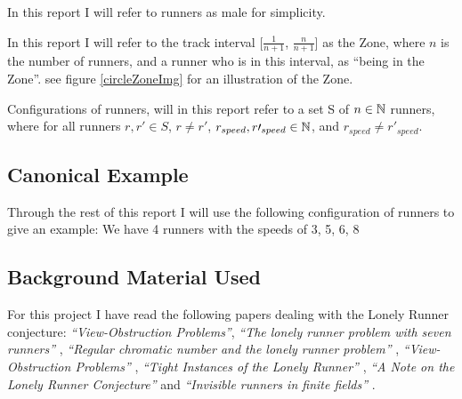 In this report I will refer to runners as male for simplicity.

\begin{defi}
\label{def:theZone}
In this report I will refer to the track interval [$\frac{1}{n + 1}$, $\frac{n}{n+1}$] as the Zone, where $n$ is the number of runners, and a runner who is in this interval, as ``being in the Zone''. see figure \ref{circleZoneImg} for an illustration of the Zone.
\end{defi}

\begin{defi}
\label{def:config}
Configurations of runners, will in this report refer to a set S of $n \in \mathbb{N}$ runners, where for all runners $r, r\prime \in S$, $r \neq r\prime$, $r_{speed}, r\prime_{speed} \in \mathbb{N}$, and $r_{speed} \neq r\prime_{speed}$.
\end{defi}

\subsection{Canonical Example}
Through the rest of this report I will use the following configuration
of runners to give an example:
We have 4 runners with the speeds of 3, 5, 6, 8

\subsection{Background Material Used}
\label{background}
For this project I have read the following papers dealing with the Lonely Runner conjecture: \emph{``View-Obstruction Problems''}\cite{Bienia97flows.view-obstructions}, \emph{``The lonely runner problem with seven runners''} \cite{serra_thelonely}, \emph{``Regular chromatic number and the lonely runner problem''} \cite{Barajas2007479}, \emph{``View-Obstruction Problems''} \cite{springerlink:10.1007/BF01832623}, \emph{``Tight Instances of the Lonely Runner''} \cite{Goddyn96tightinstances}, \emph{``A Note on the Lonely Runner Conjecture''} \cite{ANote} and \emph{``Invisible runners in finite fields''} \cite{invis}.


